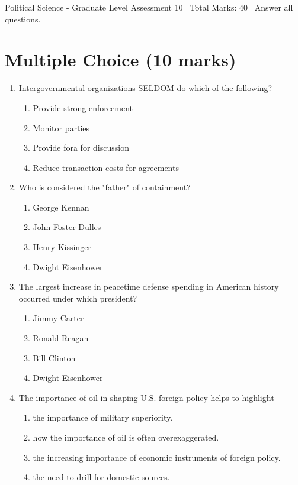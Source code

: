 \documentclass[12pt]{article}
\begin{document}
\begin{center}
Political Science - Graduate Level Assessment 10 \
Total Marks: 40 \
Answer all questions.
\end{center}

\section*{Multiple Choice (10 marks)}
\begin{enumerate}[label=\arabic*.]
\item Intergovernmental organizations SELDOM do which of the following?
\begin{enumerate}[label=(\alph*)]
    \item Provide strong enforcement
    \item Monitor parties
    \item Provide fora for discussion
    \item Reduce transaction costs for agreements
\end{enumerate}
\item Who is considered the "father" of containment?
\begin{enumerate}[label=(\alph*)]
    \item George Kennan
    \item John Foster Dulles
    \item Henry Kissinger
    \item Dwight Eisenhower
\end{enumerate}
\item The largest increase in peacetime defense spending in American history occurred under which president?
\begin{enumerate}[label=(\alph*)]
    \item Jimmy Carter
    \item Ronald Reagan
    \item Bill Clinton
    \item Dwight Eisenhower
\end{enumerate}
\item The importance of oil in shaping U.S. foreign policy helps to highlight
\begin{enumerate}[label=(\alph*)]
    \item the importance of military superiority.
    \item how the importance of oil is often overexaggerated.
    \item the increasing importance of economic instruments of foreign policy.
    \item the need to drill for domestic sources.

\end{enumerate}
\end{enumerate}
\end{document}
